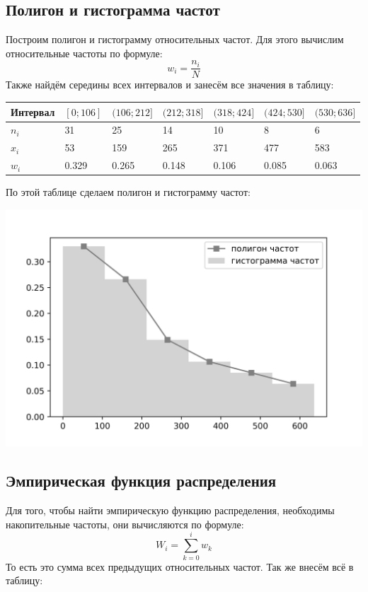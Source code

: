 \documentclass[titlepage]{article}
\begin{document}
\subsection{Полигон и гистограмма частот}
Построим полигон и гистограмму относительных частот. Для этого вычислим относительные частоты по формуле:
\begin{equation*}
w_i = \frac{n_i}{N}
\end{equation*}
Также найдём середины всех интервалов и занесём все значения в таблицу:
\begin{table}[!ht]
    \centering
    \begin{tabular}{|l|l|l|l|l|l|l|}
    \hline
        Интервал & $[0; 106]$ & $(106; 212]$ & $(212; 318]$ & $(318; 424]$ & $(424; 530]$ & $(530; 636]$ \\ \hline
        $n_i$ & 31 & 25 & 14 & 10 & 8 & 6 \\ \hline
        $x_i$ & 53 & 159 & 265 & 371 & 477 & 583 \\ \hline
        $w_i$ & 0.329 & 0.265 & 0.148 & 0.106 & 0.085 & 0.063 \\ \hline
    \end{tabular}
\end{table}

По этой таблице сделаем полигон и гистограмму частот:

\includegraphics[scale=0.6]{fig01}

\subsection{Эмпирическая функция распределения}
Для того, чтобы найти эмпирическую функцию распределения, необходимы накопительные частоты, они вычисляются по формуле:
\begin{equation*}
W_i = \sum_{k = 0}^{i} w_k
\end{equation*}
То есть это сумма всех предыдущих относительных частот. Так же внесём всё в таблицу:
\end{document}
